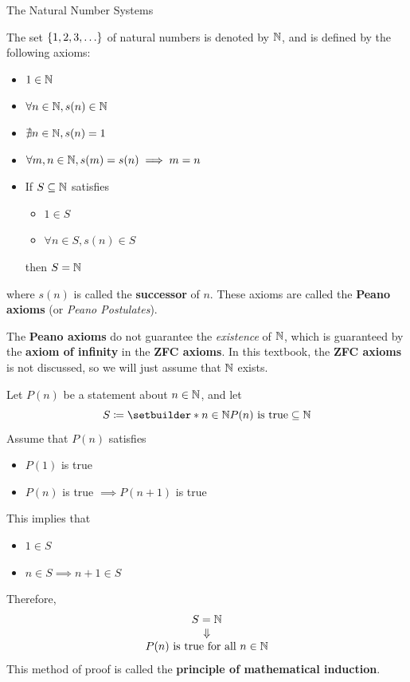 \begin{section}{The Natural Number Systems}

The set $\set*{1, 2, 3, \dots}$ of natural numbers is denoted by $\mathbb{N}$, and is defined by the following axioms:
\begin{itemize}
    \item $1 \in \mathbb{N}$
    \item $\forall n \in \mathbb{N}, s(n) \in \mathbb{N}$
    \item $\nexists n \in \mathbb{N}, s(n) = 1$
    \item $\forall m, n \in \mathbb{N}, s(m) = s(n) \implies m = n$
    \item If $S \subseteq \mathbb{N}$ satisfies
    \begin{itemize}
        \item $1 \in S$
        \item $\forall n \in S, s(n) \in S$
    \end{itemize}
    then $S = \mathbb{N}$
\end{itemize}
where $s(n)$ is called the \textbf{successor} of $n$.
These axioms are called the \textbf{Peano axioms} (or \emph{Peano Postulates}).

\bigskip

\begin{remark}
    The \textbf{Peano axioms} do not guarantee the \emph{existence} of $\mathbb{N}$, which is guaranteed by the
    \textbf{axiom of infinity} in the \textbf{ZFC axioms}. In this textbook, the \textbf{ZFC axioms}
    is not discussed, so we will just assume that $\mathbb{N}$ exists.
\end{remark}

\bigskip

\begin{definition} \label{def:MathematicalInduction}
    Let $P(n)$ be a statement about $n \in \mathbb{N}$, and let
    \[
    S \coloneqq \setbuilder*{n \in \N}{P(n) \text{ is true}} \subseteq \N
    \]
    Assume that $P(n)$ satisfies
    \begin{itemize}
        \item $P(1)$ is true
        \item $P(n)$ is true $\implies P(n + 1)$ is true
    \end{itemize}
    This implies that
    \begin{itemize}
        \item $1 \in S$
        \item $n \in S \implies n + 1 \in S$
    \end{itemize}
    Therefore,
    \[
    \begin{array}{c}
        S = \mathbb{N} \\
        \Downarrow \\
        P(n) \text{ is true for all } n \in \mathbb{N}
    \end{array}
    \]
    This method of proof is called the \textbf{principle of mathematical induction}.
\end{definition}


\end{section}
